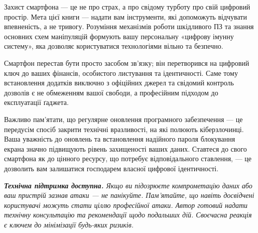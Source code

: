 Захист смартфона — це не про страх, а про свідому турботу про свій цифровий простір. Мета цієї книги — надати вам інструменти, які допоможуть відчувати впевненість, а не тривогу. Розуміння механізмів роботи шкідливого ПЗ та знання основних схем маніпуляцій формують вашу персональну «цифрову імунну систему», яка дозволяє користуватися технологіями вільно та безпечно.



Смартфон перестав бути просто засобом зв'язку; він перетворився на цифровий ключ до ваших фінансів, особистого листування та ідентичності. Саме тому встановлення додатків виключно з офіційних джерел та свідомий контроль дозволів є не обмеженням вашої свободи, а професійним підходом до експлуатації ґаджета.

Важливо пам’ятати, що регулярне оновлення програмного забезпечення — це передусім спосіб закрити технічні вразливості, на які полюють кіберзлочинці. Ваша уважність до оновлень та встановлення надійного пароля блокування екрана значно підвищують рівень захищеності ваших даних. Ставтеся до свого смартфона як до цінного ресурсу, що потребує відповідального ставлення, — це дозволить вам залишатися господарем власної цифрової ідентичності.

\textit{\textbf{Технічна підтримка доступна.} Якщо ви підозрюєте компрометацію даних або ваш пристрій зазнав атаки — не панікуйте. Пам’ятайте, що навіть досвідчені користувачі можуть стати ціллю професійної атаки. Автор готовий надати технічну консультацію та рекомендації щодо подальших дій. Своєчасна реакція є ключем до мінімізації будь-яких ризиків.}


